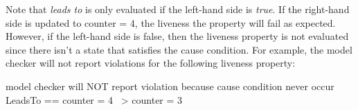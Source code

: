 Note that \textit{leads to} is only evaluated if the left-hand side is
\textit{true}. If the right-hand side is updated to counter = 4, the liveness
the property will fail as expected. However, if the left-hand side is false, then the
liveness property is not evaluated since there isn't a state that satisfies the
cause condition. For example, the model checker will not report violations for
the following liveness property:\newline
\begin{tla}
    \* model checker will NOT report violation because cause condition never occur 
    LeadsTo == counter = 4 ~> counter = 3
\end{tla}
\begin{tlatex}
%
%
\@xx{}%
\end{tlatex}

% 
